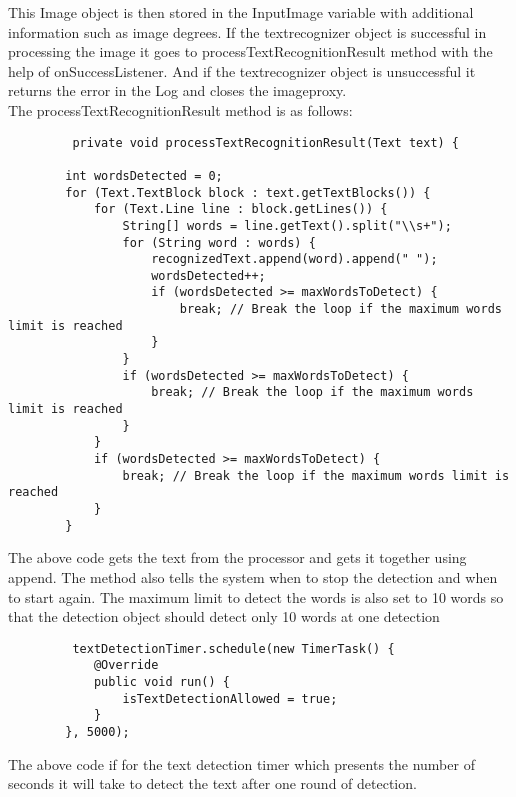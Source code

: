 \documentclass[MScCS]{uccthesis}
\begin{document}
This Image object is then stored in the InputImage variable with additional information such as image degrees. If the textrecognizer object is successful in processing the image it goes to processTextRecognitionResult method with the help of onSuccessListener. And if the textrecognizer object is unsuccessful it returns the error in the Log and closes the imageproxy.\\
The processTextRecognitionResult method is as follows: 

 \begin{scriptsize}
     \begin{verbatim}
         private void processTextRecognitionResult(Text text) {
        
        int wordsDetected = 0;
        for (Text.TextBlock block : text.getTextBlocks()) {
            for (Text.Line line : block.getLines()) {
                String[] words = line.getText().split("\\s+");
                for (String word : words) {
                    recognizedText.append(word).append(" ");
                    wordsDetected++;
                    if (wordsDetected >= maxWordsToDetect) {
                        break; // Break the loop if the maximum words limit is reached
                    }
                }
                if (wordsDetected >= maxWordsToDetect) {
                    break; // Break the loop if the maximum words limit is reached
                }
            }
            if (wordsDetected >= maxWordsToDetect) {
                break; // Break the loop if the maximum words limit is reached
            }
        }
        \end{verbatim}
 \end{scriptsize}
 The above code gets the text from the processor and gets it together using append. The method also tells the system when to stop the detection and when to start again. The maximum limit to detect the words is also set to 10 words so that the detection object should detect only 10 words at one detection

 \begin{scriptsize}
     \begin{verbatim}
         textDetectionTimer.schedule(new TimerTask() {
            @Override
            public void run() {
                isTextDetectionAllowed = true;
            }
        }, 5000);
     \end{verbatim}
 \end{scriptsize}
The above code if for the text detection timer which presents the number of seconds it will take to detect the text after one round of detection.
\end{document}
